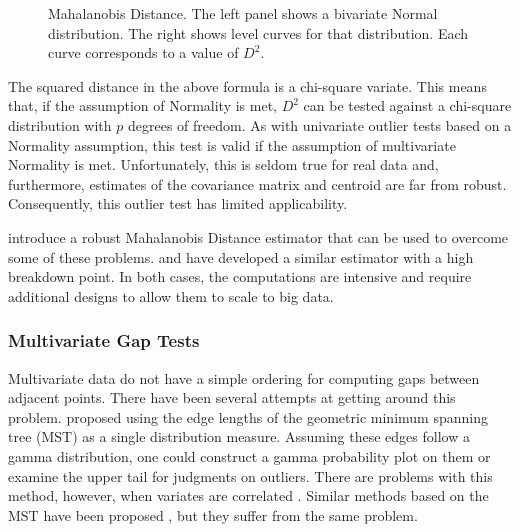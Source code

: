 \documentclass[12pt]{article}
\begin{document}
\begin{figure}[h]
\caption{\label{fig:Mahalanobis} Mahalanobis Distance. The left panel shows a bivariate Normal distribution. The right shows level curves for that distribution. Each curve corresponds to a value of $D^2$.}
\end{figure}
  
The squared distance in the above formula is a chi-square variate. This means that, if the assumption of Normality is met, $D^2$ can be tested against a chi-square distribution with $p$ degrees of freedom. As with univariate outlier tests based on a Normality assumption, this test is valid if the assumption of multivariate Normality is met. Unfortunately, this is seldom true for real data and, furthermore, estimates of the covariance matrix and centroid are far from robust. Consequently, this outlier test has limited applicability.

\cite{RousseeuwVanZomeren} introduce a robust Mahalanobis Distance estimator that can be used to overcome some of these problems. \cite{Stahel} and \cite{Donoho} have developed a similar estimator with a high breakdown point. In both cases, the computations are intensive and require additional designs to allow them to scale to big data.

\subsubsection{Multivariate Gap Tests} 
Multivariate data do not have a simple ordering for computing gaps between adjacent points. There have been several attempts at getting around this problem. \cite{Rohlf} proposed using the edge lengths of the geometric minimum spanning tree (MST) as a single distribution measure. Assuming these edges follow a gamma distribution, one could construct a gamma probability plot on them or examine the upper tail for judgments on outliers. There are problems with this method, however, when variates are correlated \citep{CaroniPrescott}. Similar methods based on the MST have been proposed \citep{LinMST,JohnVictor}, but they suffer from the same problem.
\end{document}
